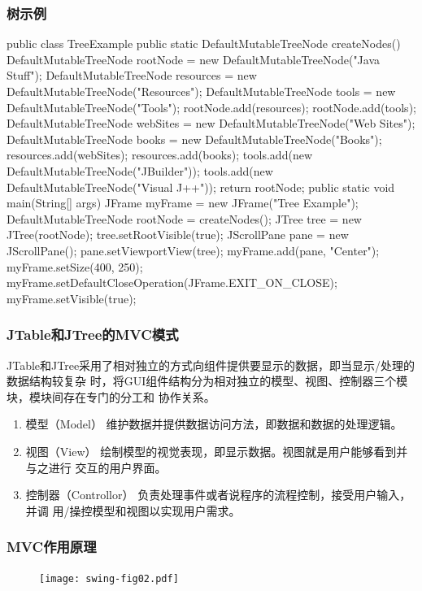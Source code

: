 \begin{frame}[fragile] %
\frametitle{树示例}


\begin{javaCode}
public class TreeExample {
  public static DefaultMutableTreeNode createNodes() {
    DefaultMutableTreeNode rootNode = new DefaultMutableTreeNode("Java Stuff");
    DefaultMutableTreeNode resources = new DefaultMutableTreeNode("Resources");
    DefaultMutableTreeNode tools = new DefaultMutableTreeNode("Tools");
    rootNode.add(resources);
    rootNode.add(tools);
    DefaultMutableTreeNode webSites = new DefaultMutableTreeNode("Web Sites");
    DefaultMutableTreeNode books = new DefaultMutableTreeNode("Books");
    resources.add(webSites);
    resources.add(books);
    tools.add(new DefaultMutableTreeNode("JBuilder"));
    tools.add(new DefaultMutableTreeNode("Visual J++"));
    return rootNode;
  }
  public static void main(String[] args) {
    JFrame myFrame = new JFrame("Tree Example");
    DefaultMutableTreeNode rootNode = createNodes();
    JTree tree = new JTree(rootNode);
    tree.setRootVisible(true);
    JScrollPane pane = new JScrollPane();
    pane.setViewportView(tree);
    myFrame.add(pane, "Center");
    myFrame.setSize(400, 250);
    myFrame.setDefaultCloseOperation(JFrame.EXIT_ON_CLOSE);
    myFrame.setVisible(true);
  }
}
\end{javaCode}
\end{frame}

\begin{frame}[fragile] %
\frametitle{JTable和JTree的MVC模式}

JTable和JTree采用了相对独立的方式向组件提供要显示的数据，即当显示/处理的数据结构较复杂
时，将GUI组件结构分为相对独立的{\hei 模型、视图、控制器}三个模块，模块间存在专门的分工和
协作关系。
\begin{enumerate}\kai 
\item {\hei 模型（Model）} 维护数据并提供数据访问方法，即数据和数据的处理逻辑。
\item {\hei 视图（View）} 绘制模型的视觉表现，即显示数据。视图就是用户能够看到并与之进行
  交互的用户界面。
\item {\hei 控制器（Controllor）} 负责处理事件或者说程序的流程控制，接受用户输入，并调
  用/操控模型和视图以实现用户需求。
\end{enumerate}
\end{frame}

\begin{frame}[fragile] %
\frametitle{MVC作用原理}

\begin{figure}
\centering
\texttt{[image: swing-fig02.pdf]}
\end{figure}
\end{frame}

